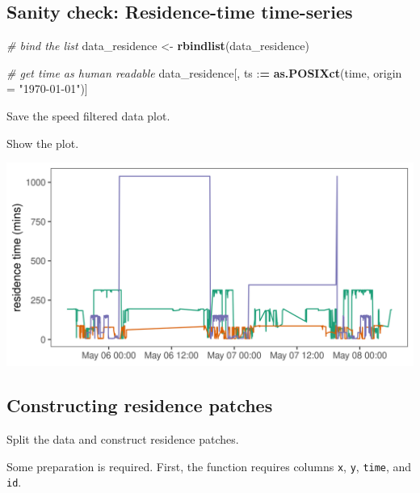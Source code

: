 \documentclass[
]{scrreprt}
\newenvironment{Shaded}{}{}
\newcommand{\CommentTok}[1]{\textcolor[rgb]{0.38,0.63,0.69}{\textit{#1}}}
\newcommand{\DataTypeTok}[1]{\textcolor[rgb]{0.56,0.13,0.00}{#1}}
\newcommand{\ErrorTok}[1]{\textcolor[rgb]{1.00,0.00,0.00}{\textbf{#1}}}
\newcommand{\KeywordTok}[1]{\textcolor[rgb]{0.00,0.44,0.13}{\textbf{#1}}}
\newcommand{\NormalTok}[1]{#1}
\newcommand{\OperatorTok}[1]{\textcolor[rgb]{0.40,0.40,0.40}{#1}}
\newcommand{\StringTok}[1]{\textcolor[rgb]{0.25,0.44,0.63}{#1}}
\begin{document}
\hypertarget{sanity-check-residence-time-time-series}{%
\subsection{Sanity check: Residence-time time-series}\label{sanity-check-residence-time-time-series}}

\begin{Shaded}
\begin{Highlighting}[]
\CommentTok{\# bind the list}
\NormalTok{data\_residence <{-}}\StringTok{ }\KeywordTok{rbindlist}\NormalTok{(data\_residence)}

\CommentTok{\# get time as human readable}
\NormalTok{data\_residence[, ts }\OperatorTok{:}\ErrorTok{=}\StringTok{ }\KeywordTok{as.POSIXct}\NormalTok{(time, }\DataTypeTok{origin =} \StringTok{"1970{-}01{-}01"}\NormalTok{)]}
\end{Highlighting}
\end{Shaded}

Save the speed filtered data plot.

Show the plot.

\includegraphics{figures/fig_bat_res_timeseries.png}

\hypertarget{constructing-residence-patches}{%
\subsection{Constructing residence patches}\label{constructing-residence-patches}}

Split the data and construct residence patches.

Some preparation is required. First, the function requires columns \texttt{x}, \texttt{y},
\texttt{time}, and \texttt{id}.
\end{document}
